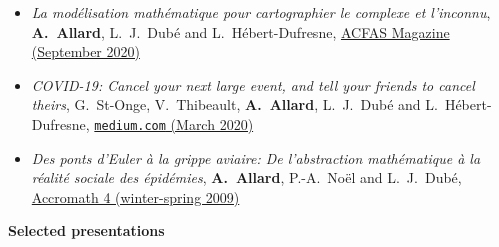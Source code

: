 \documentclass[11pt]{article}
\begin{document}
\begin{itemize}[itemsep=0.5em]
%
\item \textit{La modélisation mathématique pour cartographier le complexe et l’inconnu}\footnotemark, \textbf{A.~Allard}, L.~J.~Dub\'e and L.~H\'ebert-Dufresne, \href{https://www.acfas.ca/publications/magazine/2019/09/modelisation-mathematique-cartographier-complexe-inconnu}{ACFAS Magazine (September 2020)}
%
%
  \item \textit{COVID-19: Cancel your next large event, and tell your friends to cancel theirs}, G.~St-Onge, V.~Thibeault, \textbf{A.~Allard}, L.~J.~Dub\'e and L.~H\'ebert-Dufresne, \href{https://medium.com/@antoine.allard/covid-19-cancel-your-next-large-event-and-tell-your-friends-to-cancel-theirs-7c06e688474e}{\texttt{medium.com} (March 2020)}
%
  \item \textit{Des ponts d'Euler \`a la grippe aviaire: De l'abstraction math\'ematique \`a la r\'ealit\'e sociale des \'epid\'emies}\footnotemark, \textbf{A.~Allard}, P.-A.~No\"el and L.~J.~Dub\'e, \href{https://accromath.uqam.ca/2009/02/des-ponts-deuler-a-la-grippe-aviaire/}{Accromath 4 (winter-spring 2009)}
%
%
\end{itemize}
%
%
%
\textbf{Selected presentations\footnotemark}
%
%
\end{document}
